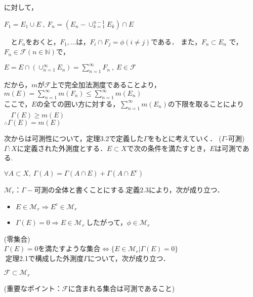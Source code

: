 \documentclass[11pt, a4paper, dvipdfmx]{jsarticle}
\theoremstyle{definition}
\newcommand{\N}{\mathbb{N}}
\newcommand{\F}{\mathcal{F}}
\begin{document}
\begin{itemize}
  に対して，
　\begin{center}
  $F_1 = E_1 \cup E~,~F_n = (E_n-\cup^{n-1}_{k=1}E_k) \cap E$
　\end{center}
　と$F_n$をおくと，$F_1,...$は，$F_i \cap F_j = \phi(i \neq j)$である．
  また，$F_n \subset E_n$  で，$F_n \in \F(n \in \N)$で，
  \begin{center}
    $E = E \cap (\cup^{\infty}_{n =1}E_n) = \sum^{\infty}_{n=1}F_n~,~E \in \F$
  \end{center}
  だから，$m$が$\F$上で完全加法測度であることより，
  $m(E) = \sum^{\infty}_{n=1}m(F_n) \le \sum^{\infty}_{n=1}m(E_n)$\\
  ここで，$E$の全ての囲い方に対する，$\sum^{\infty}_{n=1}m(E_n)$の下限を取ることにより
　$\Gamma(E) \ge m(E)$\\
  $\therefore \Gamma(E) = m(E)$
\end{itemize}
次からは可測性について，定理3.2で定義した$\Gamma$をもとに考えていく．
\Definition ($\Gamma$-可測)\\
$\Gamma:X$に定義された外測度とする．$E \subset X$で次の条件を満たすとき，$E$は可測である.
\begin{center}
  $\forall A \subset X,~\Gamma(A) = \Gamma(A \cap E) + \Gamma(A \cap E^{c})$
\end{center}

$\mathcal{M}_r：\Gamma-$可測の全体と書くことにする.定義$2.3$により，次が成り立つ．
\begin{itemize}
  \item $E \in \mathcal{M}_r \Rightarrow E^{c} \in \mathcal{M}_r$\\
  \item $\Gamma(E)=0 \Rightarrow E \in \mathcal{M}_r~$したがって，$\phi \in \mathcal{M}_r$\\
\end{itemize}

\Definition(零集合)\\
$\Gamma(E) = 0$を満たすような集合$\Leftrightarrow \{E \in \mathcal{M}_r|\Gamma(E)=0\}$\\

\Theorem$~$定理2.1で構成した外測度$\Gamma$について，次が成り立つ．
\begin{center}
  $\F \subset \mathcal{M}_r$
\end{center}
(重要なポイント：$\F$に含まれる集合は可測であること)\\
\end{document}
